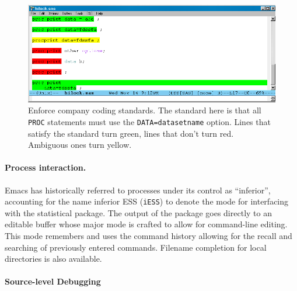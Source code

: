 \documentclass{article}
\newif\ifdraft
\newcommand{\stexttt}[1]{{\small\texttt{#1}}}
\newcommand{\emptyfig}{
\hspace*{42pt}\rule{324pt}{.25pt}\\
\hspace*{42pt}\rule{.25pt}{10pc}
\rule{316pt}{.25pt}
\rule{.25pt}{10pc}}
\begin{document}
\begin{figure}[htbp]
  \centering
  \includegraphics[angle=270,width=\textwidth]{hilock-sas}
  \caption{Enforce company coding
    standards.  The standard here is that all \stexttt{PROC}
    statements must use the \stexttt{DATA=datasetname} option.  Lines
    that satisfy the standard turn green, lines that don't turn red.
    Ambiguous ones turn yellow.} %
  \label{f.hilock}
\end{figure}


\paragraph{Process interaction.}
Emacs has historically referred to processes under its control as
``inferior'', accounting for the name inferior ESS (\stexttt{iESS}) to
denote the mode for interfacing with the statistical package.  The
output of the package goes directly to an editable buffer
whose major mode is crafted to allow for command-line editing.  This
mode remembers and uses the command history allowing for the recall and
searching of previously entered commands.  Filename completion for
local directories is also available.

\paragraph{Source-level Debugging}%
\end{document}
